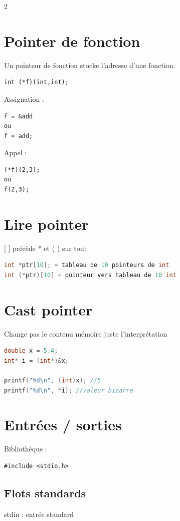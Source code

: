 \documentclass[8pt]{article}
\begin{document}
\begin{multicols}{2}
\section{Pointer de fonction}

Un pointeur de fonction stocke l'adresse d'une fonction.

\begin{lstlisting}
int (*f)(int,int);
\end{lstlisting}

Assignation :

\begin{lstlisting}
f = &add
ou
f = add;
\end{lstlisting}

Appel :

\begin{lstlisting}
(*f)(2,3);
ou
f(2,3);
\end{lstlisting}

\section{Lire pointer}
[ ] précède * et ( ) sur tout

\begin{lstlisting}[language = C]
int *ptr[10]; = tableau de 10 pointeurs de int  
int (*ptr)[10] = pointeur vers tableau de 10 int
\end{lstlisting}

\section{Cast pointer}
Change pas le contenu mémoire juste l'interprétation
\begin{lstlisting}[language = C]
double x = 5.4;
int* i = (int*)&x;

printf("%d\n", (int)x); //5
printf("%d\n", *i); //valeur bizarre
\end{lstlisting}

\section{Entrées / sorties}

Bibliothèque :

\begin{lstlisting}
#include <stdio.h>
\end{lstlisting}

\subsection{Flots standards}
stdin : entrée standard


\end{multicols}
\end{document}
